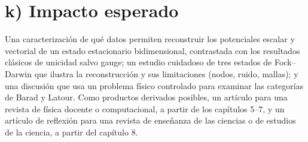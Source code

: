 \documentclass[12pt,letterpaper]{article}
\begin{document}
\section*{k) Impacto esperado}
Una caracterización de qué datos permiten reconstruir los potenciales escalar y vectorial de un estado estacionario
bidimensional, contrastada con los resultados clásicos de unicidad salvo gauge; un estudio cuidadoso de tres estados de
Fock--Darwin que ilustra la reconstrucción y sus limitaciones (nodos, ruido, mallas); y una discusión que usa un problema
físico controlado para examinar las categorías de Barad y Latour. Como productos derivados posibles, un artículo para una
revista de física docente o computacional, a partir de los capítulos 5--7, y un artículo de reflexión para una revista de
enseñanza de las ciencias o de estudios de la ciencia, a partir del capítulo 8.

\end{document}
